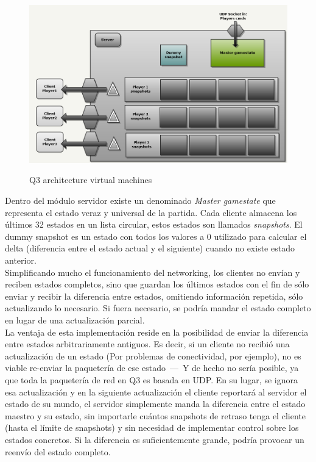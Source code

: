 \documentclass[a4paper,12pt]{report}
\begin{document}
	\begin{center}
		\begin{figure}[h]
			\includegraphics[width=1\textwidth]{images/q3_network_arch}
			\label{fig:q3vm}
			\caption{Q3 architecture virtual machines}
		\end{figure}
	\end{center}

	Dentro del módulo servidor existe un denominado \textit{Master gamestate} que representa el estado veraz y universal de la partida. Cada cliente almacena los últimos 32 estados en un lista circular, estos estados son llamados \textit{snapshots}. El dummy snapshot es un estado con todos los valores a 0 utilizado para calcular el delta (diferencia entre el estado actual y el siguiente) cuando no existe estado anterior.\\
	
	Simplificando mucho el funcionamiento del networking, los clientes no envían y reciben estados completos, sino que guardan los últimos estados con el fin de sólo enviar y recibir la diferencia entre estados, omitiendo información repetida, sólo actualizando lo necesario. Si fuera necesario, se podría mandar el estado completo en lugar de una actualización parcial.\\
	
	La ventaja de esta implementación reside en la posibilidad de enviar la diferencia entre estados arbitrariamente antiguos. Es decir, si un cliente no recibió una actualización de un estado (Por problemas de conectividad, por ejemplo), no es viable re-enviar la paquetería de ese estado \,---\ Y de hecho no sería posible, ya que toda la paquetería de red en Q3 es basada en UDP. En su lugar, se ignora esa actualización y en la siguiente actualización el cliente reportará al servidor el estado de su mundo, el servidor simplemente manda la diferencia entre el estado maestro y su estado, sin importarle cuántos snapshots de retraso tenga el cliente (hasta el límite de snapshots) y sin necesidad de implementar control sobre los estados concretos. Si la diferencia es suficientemente grande, podría provocar un reenvío del estado completo.
	
\end{document}
